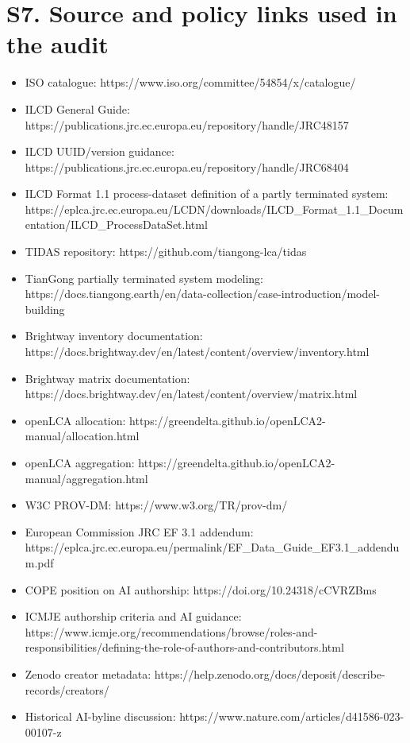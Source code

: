 \documentclass[
  10pt,
  a4paper,
  DIV=11,
  numbers=noendperiod]{scrartcl}
\providecommand{\tightlist}{%
  \setlength{\itemsep}{0pt}\setlength{\parskip}{0pt}}
\begin{document}
\section{S7. Source and policy links used in the
audit}\label{s7.-source-and-policy-links-used-in-the-audit}

\begin{itemize}
\tightlist
\item
  ISO catalogue: https://www.iso.org/committee/54854/x/catalogue/
\item
  ILCD General Guide:
  https://publications.jrc.ec.europa.eu/repository/handle/JRC48157
\item
  ILCD UUID/version guidance:
  https://publications.jrc.ec.europa.eu/repository/handle/JRC68404
\item
  ILCD Format 1.1 process-dataset definition of a partly terminated
  system:
  https://eplca.jrc.ec.europa.eu/LCDN/downloads/ILCD\_Format\_1.1\_Documentation/ILCD\_ProcessDataSet.html
\item
  TIDAS repository: https://github.com/tiangong-lca/tidas
\item
  TianGong partially terminated system modeling:
  https://docs.tiangong.earth/en/data-collection/case-introduction/model-building
\item
  Brightway inventory documentation:
  https://docs.brightway.dev/en/latest/content/overview/inventory.html
\item
  Brightway matrix documentation:
  https://docs.brightway.dev/en/latest/content/overview/matrix.html
\item
  openLCA allocation:
  https://greendelta.github.io/openLCA2-manual/allocation.html
\item
  openLCA aggregation:
  https://greendelta.github.io/openLCA2-manual/aggregation.html
\item
  W3C PROV-DM: https://www.w3.org/TR/prov-dm/
\item
  European Commission JRC EF 3.1 addendum:
  https://eplca.jrc.ec.europa.eu/permalink/EF\_Data\_Guide\_EF3.1\_addendum.pdf
\item
  COPE position on AI authorship: https://doi.org/10.24318/cCVRZBms
\item
  ICMJE authorship criteria and AI guidance:
  https://www.icmje.org/recommendations/browse/roles-and-responsibilities/defining-the-role-of-authors-and-contributors.html
\item
  Zenodo creator metadata:
  https://help.zenodo.org/docs/deposit/describe-records/creators/
\item
  Historical AI-byline discussion:
  https://www.nature.com/articles/d41586-023-00107-z
\end{itemize}
\end{document}
